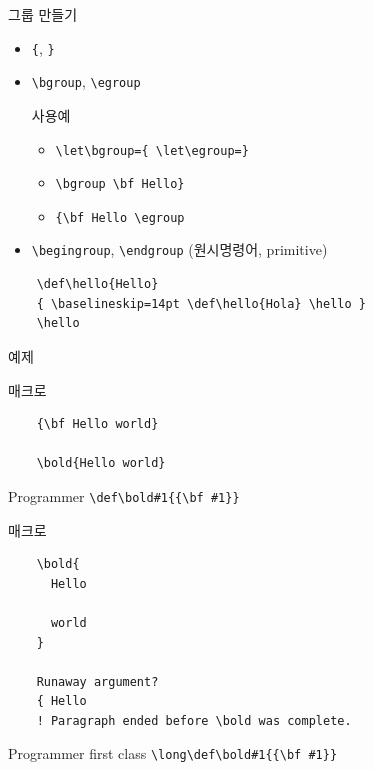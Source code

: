 \documentclass{beamer}
\begin{document}
%
\begin{frame}[fragile]{그룹 만들기}
  \begin{itemize}
  \item \verb+{+, \verb+}+
  \item \verb+\bgroup+, \verb+\egroup+
    \begin{alertblock}{사용예}
      \begin{itemize}
      \item \verb+\let\bgroup={ \let\egroup=}+
      \item \verb+\bgroup \bf Hello}+
      \item \verb+{\bf Hello \egroup+
      \end{itemize}
    \end{alertblock}
  \item \verb+\begingroup+, \verb+\endgroup+ (원시명령어, primitive)
  \end{itemize}

  {\small
  \begin{verbatim}
    \def\hello{Hello}
    { \baselineskip=14pt \def\hello{Hola} \hello }
    \hello
  \end{verbatim}}
\end{frame}


\begin{frame}[standout]
  예제
\end{frame}

%
\begin{frame}[fragile]{\texttt{\string\bold} 매크로}
  \begin{verbatim}
    {\bf Hello world}
    
    \bold{Hello world}
  \end{verbatim}
  \begin{alertblock}{Programmer}
    \verb+\def\bold#1{{\bf #1}}+
  \end{alertblock}
\end{frame}


%
\begin{frame}[fragile]{\texttt{\string\bold} 매크로}
  \begin{verbatim}
    \bold{
      Hello

      world
    }

    Runaway argument?
    { Hello
    ! Paragraph ended before \bold was complete.
  \end{verbatim}
  \begin{alertblock}{Programmer first class}
    \verb+\long\def\bold#1{{\bf #1}}+
  \end{alertblock}
\end{frame}
\end{document}
